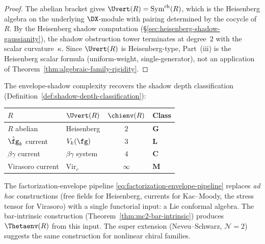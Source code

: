 \begin{proof}
The abelian bracket gives $\Uvert(R) = \mathrm{Sym}^{\mathrm{ch}}(R)$,
which is the Heisenberg algebra on the underlying $\DX$-module
with pairing determined by the cocycle of~$R$.
By the Heisenberg shadow computation
(\S\ref{sec:heisenberg-shadow-gaussianity}), the
shadow obstruction tower terminates at degree~$2$ with the scalar
curvature~$\kappa$. Since $\Uvert(R)$ is Heisenberg-type,
Part~(iii) is the Heisenberg scalar formula (uniform-weight,
single-generator), not an application of
Theorem~\ref{thm:algebraic-family-rigidity}.
\end{proof}

\begin{remark}
\label{rem:envelope-shadow-complexity-standard}
The envelope-shadow complexity recovers the shadow depth
classification
(Definition~\ref{def:shadow-depth-classification}):
\begin{center}
\renewcommand{\arraystretch}{1.15}
\begin{tabular}{@{}llcl@{}}
\toprule
\textbf{$R$} & \textbf{$\Uvert(R)$}
 & $\chienv(R)$ & \textbf{Class} \\
\midrule
$R$ abelian & Heisenberg & $2$ & $\mathbf{G}$ \\
$\hat{\fg}_k$ current & $V_k(\fg)$ & $3$ & $\mathbf{L}$ \\
$\beta\gamma$ current & $\beta\gamma$ system & $4$ & $\mathbf{C}$ \\
Virasoro current & $\mathrm{Vir}_c$ & $\infty$ & $\mathbf{M}$ \\
\bottomrule
\end{tabular}
\end{center}
\end{remark}

\begin{remark}
\label{rem:from-examples-to-machine}
The factorization-envelope pipeline
\eqref{eq:factorization-envelope-pipeline} replaces \emph{ad hoc}
constructions (free fields for Heisenberg, currents for
Kac--Moody, the stress tensor for Virasoro) with a single
functorial input: a Lie conformal algebra. The bar-intrinsic
construction (Theorem~\ref{thm:mc2-bar-intrinsic}) produces
$\Thetaenv(R)$ from this input. The super
extension (Neveu--Schwarz, $\mathcal{N}=2$) suggests the
same construction for nonlinear chiral families.
\end{remark}

